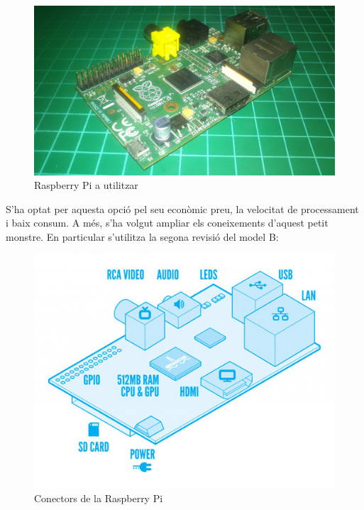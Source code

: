 \documentclass[twoside]{article}
\begin{document}
\begin{figure}[h!]
\begin{center}
\includegraphics[scale=0.06]{images/RPi.jpg}
\caption{Raspberry Pi a utilitzar}
\label{RPiImage}
\end{center}
\end{figure}

S'ha optat per aquesta opció pel seu econòmic preu, la velocitat de processament i baix consum. A més, s'ha volgut ampliar els coneixements d'aquest petit monstre. En particular s'utilitza la segona revisió del model B:

\begin{figure}[h!]
\begin{center}
\includegraphics[scale=0.3]{images/RPi2.jpg}
\caption{Conectors de la Raspberry Pi}
\label{RPiConn}
\end{center}
\end{figure}
\end{document}
